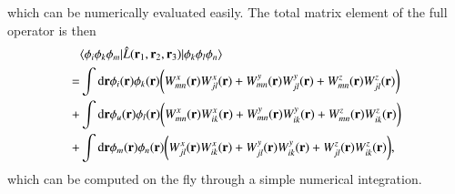\documentclass[aip,jcp,reprint,noshowkeys,superscriptaddress]{revtex4-1}
\newcommand{\matelem}[3]{\langle #1 | #2 | #3 \rangle}
\newcommand{\bri}[1]{{\bf r}_{#1}}
\begin{document}
which can be numerically evaluated easily. 
The total matrix element of the full operator is then 
\begin{equation}
 \label{eq:l_ijmkln_final}
 \begin{aligned}
 & \matelem{\phi_i \phi_k \phi_m}{\hat{L}(\bri{1},\bri{2},\bri{3})}{\phi_k \phi_l \phi_n} \\
 = & \int \text{d}{\bf r} \phi_i({\bf r})  \phi_k({\bf r}) \bigg( W_{mn}^x({\bf r}) W_{jl}^x({\bf r}) + W_{mn}^y({\bf r}) W_{jl}^y({\bf r}) + W_{mn}^z({\bf r}) W_{jl}^z({\bf r})\bigg) \\
 + & \int \text{d}{\bf r}\phi_u({\bf r})  \phi_l({\bf r}) \bigg( W_{mn}^x({\bf r}) W_{ik}^x({\bf r}) + W_{mn}^y({\bf r}) W_{ik}^y({\bf r}) + W_{mn}^z({\bf r}) W_{ik}^z({\bf r})\bigg) \\
 + & \int \text{d}{\bf r} \phi_m({\bf r})  \phi_n({\bf r}) \bigg( W_{jl}^x({\bf r}) W_{ik}^x({\bf r}) + W_{jl}^y({\bf r}) W_{ik}^y({\bf r}) + W_{jl}^z({\bf r}) W_{ik}^z({\bf r})\bigg), 
 \end{aligned}
\end{equation}
which can be computed on the fly through a simple numerical integration. 

                                                                                                                                                
\end{document}
